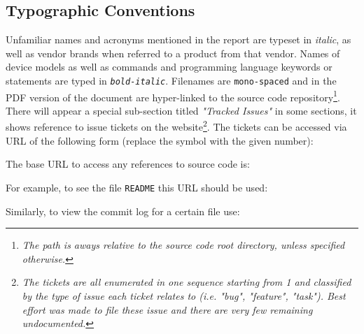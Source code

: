\pagebreak
\subsection{Typographic Conventions} \label{sec:conv}

  Unfamiliar names and acronyms mentioned in the report are typeset in \emph{italic},
 as well as vendor brands when referred to a product from that vendor. Names of device
 models as well as commands and programming language keywords or statements are typed
 in \emph{\texttt{bold-italic}}. Filenames are \texttt{mono-spaced} and in the PDF
 version of the document are hyper-linked to the source code repository\footnote{%
 \emph{The path is aways relative to the source code root directory, unless specified
 otherwise.}}. There will appear a special sub-section titled \emph{"Tracked Issues"}
 in some sections, it shows reference to issue tickets on the website\footnote{\emph{%
 The tickets are all enumerated in one sequence starting from 1 and classified by the
 type of issue each ticket relates to (i.e. "bug", "feature", "task"). Best effort
 was made to file these issue and there are very few remaining undocumented.}}.
 The tickets can be accessed via URL of the following form (replace the 
 symbol with the given number): 

  The base URL to access any references to source code is:

  For example, to see the file \texttt{README} this URL should be used:

  Similarly, to view the commit log for a certain file use:

